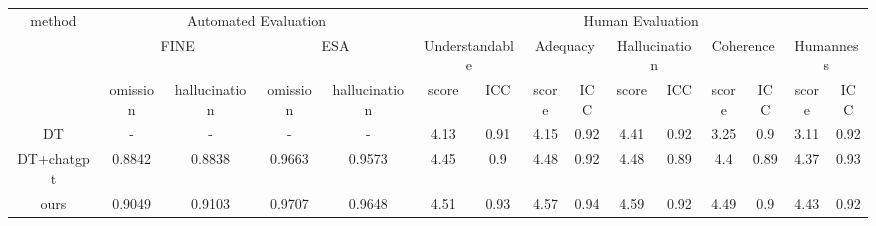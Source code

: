 \begin{table}[]
\begin{tabular}{ccccccccccccccc}
\multirow{3}{*}{method} & \multicolumn{4}{c}{Automated Evaluation}            & \multicolumn{10}{c}{Human Evaluation}                                                                                                                                 \\
                        & \multicolumn{2}{c}{FINE} & \multicolumn{2}{c}{ESA}  & \multicolumn{2}{c}{Understandable} & \multicolumn{2}{c}{Adequacy} & \multicolumn{2}{c}{Hallucination} & \multicolumn{2}{c}{Coherence} & \multicolumn{2}{c}{Humanness} \\
                        & omission & hallucination & omission & hallucination & score            & ICC             & score         & ICC          & score            & ICC            & score          & ICC          & score          & ICC          \\
DT                      & -        & -             & -        & -             & 4.13             & 0.91            & 4.15          & 0.92         & 4.41             & 0.92           & 3.25           & 0.9          & 3.11           & 0.92         \\
DT+chatgpt              & 0.8842   & 0.8838        & 0.9663   & 0.9573        & 4.45             & 0.9             & 4.48          & 0.92         & 4.48             & 0.89           & 4.4            & 0.89         & 4.37           & 0.93         \\
ours                    & 0.9049   & 0.9103        & 0.9707   & 0.9648        & 4.51             & 0.93            & 4.57          & 0.94         & 4.59             & 0.92           & 4.49           & 0.9          & 4.43           & 0.92        
\end{tabular}
\end{table}